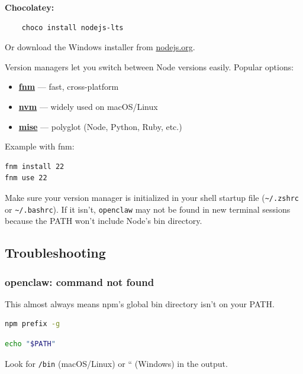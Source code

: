 \textbf{Chocolatey:}

\begin{lstlisting}
    choco install nodejs-lts
\end{lstlisting}


Or download the Windows installer from \href{https://nodejs.org/}{nodejs.org}.


Version managers let you switch between Node versions easily. Popular options:

\begin{itemize}
  \item \href{https://github.com/Schniz/fnm}{\textbf{fnm}} — fast, cross-platform
  \item \href{https://github.com/nvm-sh/nvm}{\textbf{nvm}} — widely used on macOS/Linux
  \item \href{https://mise.jdx.dev/}{\textbf{mise}} — polyglot (Node, Python, Ruby, etc.)
\end{itemize}


Example with fnm:

\begin{lstlisting}[language=bash]
fnm install 22
fnm use 22
\end{lstlisting}


Make sure your version manager is initialized in your shell startup file (\texttt{\textasciitilde{}/.zshrc} or \texttt{\textasciitilde{}/.bashrc}). If it isn't, \texttt{openclaw} may not be found in new terminal sessions because the PATH won't include Node's bin directory.

\subsection{Troubleshooting}


\subsubsection{openclaw: command not found}


This almost always means npm's global bin directory isn't on your PATH.

\begin{lstlisting}[language=bash]
    npm prefix -g
\end{lstlisting}

\begin{lstlisting}[language=bash]
    echo "$PATH"
\end{lstlisting}


Look for \texttt{/bin} (macOS/Linux) or `` (Windows) in the output.

